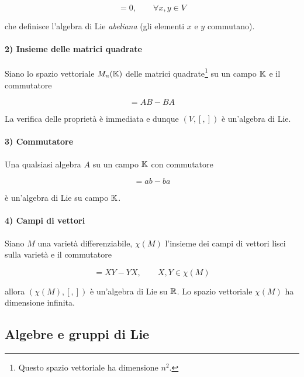 \begin{equation}
	[x,y] = 0, \qquad \forall x,y \in V
\end{equation}

che definisce l'algebra di Lie \textit{abeliana} (gli elementi $ x $ e $ y $ commutano).

\paragraph{2) Insieme delle matrici quadrate}

Siano lo spazio vettoriale $ M_{n}(\mathbb{K}) $ delle matrici quadrate\footnote{%
	Questo spazio vettoriale ha dimensione $ n^{2} $.%
} su un campo $ \mathbb{K} $ e il commutatore

\begin{equation}
	[A,B] = AB - BA
\end{equation}

La verifica delle proprietà è immediata e dunque $ (V,[,]) $ è un'algebra di Lie.

\paragraph{3) Commutatore}

Una qualsiasi algebra $ A $ su un campo $ \mathbb{K} $ con commutatore

\begin{equation}
	[a,b] = ab - ba
\end{equation}

è un'algebra di Lie su campo $ \mathbb{K} $.

\paragraph{4) Campi di vettori}

Siano $ M $ una varietà differenziabile, $ \chi(M) $ l'insieme dei campi di vettori lisci sulla varietà e il commutatore

\begin{equation}
	[X,Y] = XY - YX, \qquad X,Y \in \chi(M)
\end{equation}

allora $ (\chi(M),[,]) $ è un'algebra di Lie su $ \mathbb{R} $. Lo spazio vettoriale $ \chi(M) $ ha dimensione infinita.

\subsection{Algebre e gruppi di Lie}

